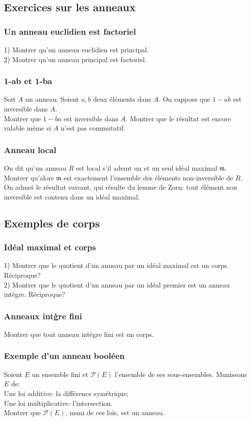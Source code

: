 \documentclass{article}
\begin{document}
\subsection{Exercices sur les anneaux}
\subsubsection{Un anneau euclidien est factoriel}\label{euclidien}
1) Montrer qu'un anneau euclidien est principal.\\
2) Montrer qu'un anneau principal est factoriel.
\subsubsection{1-ab et 1-ba}
Soit $A$ un anneau. Soient $a,b$ deux \'el\'ements dans $A$. On suppose que $1-ab$ est inversible dans $A$.\\
Montrer que $1-ba$ est inversible dans $A$. Montrer que le r\'esultat est encore valable m\^eme si $A$ n'est pas commutatif.
\subsubsection{Anneau local}
On dit qu'un anneau $R$ est local s'il ademt un et un seul id\'eal maximal $\mathfrak{m}$.\\
Montrer qu'alors $\mathfrak{m}$ est exactement l'ensemble des \'el\'ements non-inversible de $R$.\\
On admet le r\'esultat suivant, qui r\'esulte du lemme de Zorn: tout \'el\'ement non inversible est contenu dans un id\'eal maximal.

\subsection{Exemples de corps}
\subsubsection{Id\'eal maximal et corps}
1) Montrer que le quotient d'un anneau par un id\'eal maximal est un corps. R\'eciproque?\\
2) Montrer que le quotient d'un anneau par un id\'eal premier est un anneau int\`egre. R\'eciproque?
\subsubsection{Anneaux int\`gre fini}
Montrer que tout anneau int\`egre fini est un corps.
\subsubsection{Exemple d'un anneau bool\'een}
Soient $E$ un ensemble fini et $\mathcal{P}(E)$ l'ensemble de ses sous-ensembles. Munissons $E$ de:\\
Une loi additive: la diff\'erence sym\'etrique;\\
Une loi multiplicative: l'intersection.\\
Montrer que $\mathcal{P}(E)$, muni de ces lois, est un anneau.
\end{document}
